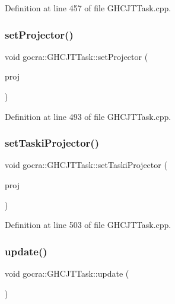 Definition at line 457 of file G\+H\+C\+J\+T\+Task.\+cpp.

\hypertarget{classgocra_1_1GHCJTTask_a391580beeeb10e00c4cd88e9fe241a2c}{}\label{classgocra_1_1GHCJTTask_a391580beeeb10e00c4cd88e9fe241a2c} 
\subsubsection{\texorpdfstring{set\+Projector()}{setProjector()}}
{\footnotesize\ttfamily void gocra\+::\+G\+H\+C\+J\+T\+Task\+::set\+Projector (\begin{DoxyParamCaption}\item[{Eigen\+::\+Matrix\+Xd \&}]{proj }\end{DoxyParamCaption})}



Definition at line 493 of file G\+H\+C\+J\+T\+Task.\+cpp.

\hypertarget{classgocra_1_1GHCJTTask_a8a6eff40a7476c8715a4cfbac756655e}{}\label{classgocra_1_1GHCJTTask_a8a6eff40a7476c8715a4cfbac756655e} 
\subsubsection{\texorpdfstring{set\+Taski\+Projector()}{setTaskiProjector()}}
{\footnotesize\ttfamily void gocra\+::\+G\+H\+C\+J\+T\+Task\+::set\+Taski\+Projector (\begin{DoxyParamCaption}\item[{Eigen\+::\+Matrix\+Xd \&}]{proj }\end{DoxyParamCaption})}



Definition at line 503 of file G\+H\+C\+J\+T\+Task.\+cpp.

\hypertarget{classgocra_1_1GHCJTTask_a5c2a49cb14720321fdfb91c899f87dac}{}\label{classgocra_1_1GHCJTTask_a5c2a49cb14720321fdfb91c899f87dac} 
\subsubsection{\texorpdfstring{update()}{update()}}
{\footnotesize\ttfamily void gocra\+::\+G\+H\+C\+J\+T\+Task\+::update (\begin{DoxyParamCaption}{ }\end{DoxyParamCaption})\hspace{0.3cm}{\ttfamily [protected]}}



